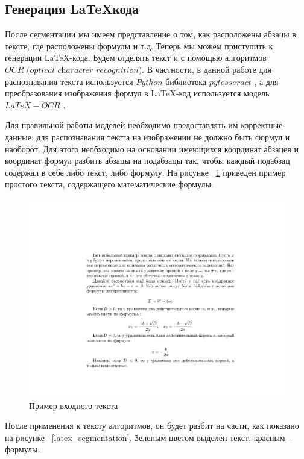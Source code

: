 \subsection{Генерация \LaTeX\-кода}

После сегментации мы имеем представление о том, как расположены абзацы в тексте, где расположены формулы и т.д. Теперь мы можем приступить к генерации \LaTeX-кода.
Будем отделять текст и с помощью алгоритмов $\textit{OCR (optical character recognition)}$. В частности, в данной работе для распознавания текста используется $Python$ библиотека $pytesseract$ \cite{pytesseract}, а для преобразования изображения формул в \LaTeX-код используется модель $LaTeX-OCR$ \cite{LaTeX-OCR}.

Для правильной работы моделей необходимо предоставлять им корректные данные: для распознавания текста на изображении не должно быть формул и наоборот. Для этого необходимо на основании имеющихся координат абзацев и координат формул разбить абзацы на подабзацы так, чтобы каждый подабзац содержал в себе либо текст, либо формулу.
На рисунке ~\ref{latex_generate_input} приведен пример простого текста, содержащего математические формулы.

\begin{figure}
    \includegraphics[scale=0.75]{img/latex_generation/input.jpg}
    \caption{Пример входного текста}
    \label{latex_generate_input}
\end{figure}

После применения к тексту алгоритмов, он будет разбит на части, как показано на рисунке ~\ref{latex_segmentation}. Зеленым цветом выделен текст, красным - формулы.

